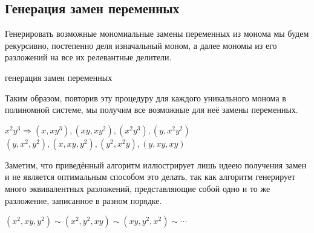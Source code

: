 \subsection{Генерация замен переменных} \label{sec:replacement-generation}

Генерировать возможные мономиальные замены переменных из монома мы будем рекурсивно, постепенно деля изначальный моном, а далее мономы из его разложений на все их релевантные делители.

\begin{algorithm}[H]
\SetAlgoLined
{}

\BlankLine
\BlankLine
{}
\caption{генерация замен переменных} \label{algo:Replacement-Gen}
\end{algorithm}

Таким образом, повторив эту процедуру для каждого уникального монома в полиномной системе, мы получим все возможные для неё замены переменных. 

\begin{example}
    $x^2y^3 \Longrightarrow (x, xy^3), (xy, xy^2), (x^2 y^3), (y, x^2 y^2)$ \linebreak $(y, x^2, y^2), (x, xy, y^2), (y^2, x^2 y), (y, xy, xy)$
\end{example}

Заметим, что приведённый алгоритм иллюстрирует лишь идеею получения замен и не является оптимальным способом это делать, так как алгоритм генерирует много эквивалентных разложений, представляющие собой одно и то же разложение, записанное в разном порядке.
\begin{example}
    $(x^2, xy, y^2) \sim (x^2, y^2, xy) \sim (xy, y^2, x^2) \sim \cdots$
\end{example}


